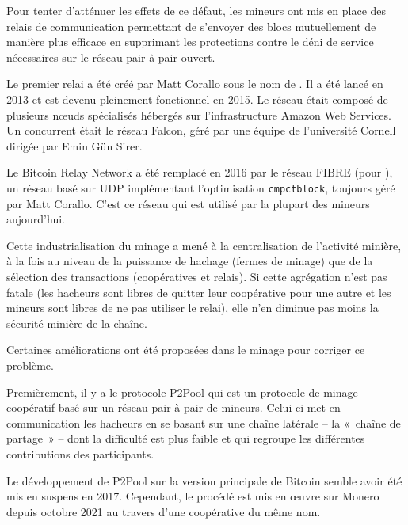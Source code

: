 Pour tenter d'atténuer les effets de ce défaut, les mineurs ont mis en place des relais de communication permettant de s'envoyer des blocs mutuellement de manière plus efficace en supprimant les protections contre le déni de service nécessaires sur le réseau pair-à-pair ouvert.

Le premier relai a été créé par Matt Corallo sous le nom de . Il a été lancé en 2013 et est devenu pleinement fonctionnel en 2015. Le réseau était composé de plusieurs nœuds spécialisés hébergés sur l'infrastructure Amazon Web Services. Un concurrent était le réseau Falcon, géré par une équipe de l'université Cornell dirigée par Emin Gün Sirer.

Le Bitcoin Relay Network a été remplacé en 2016 par le réseau FIBRE (pour ), un réseau basé sur UDP implémentant l'optimisation \texttt{cmpctblock}, toujours géré par Matt Corallo. C'est ce réseau qui est utilisé par la plupart des mineurs aujourd'hui.


Cette industrialisation du minage a mené à la centralisation de l'activité minière, à la fois au niveau de la puissance de hachage (fermes de minage) que de la sélection des transactions (coopératives et relais). Si cette agrégation n'est pas fatale (les hacheurs sont libres de quitter leur coopérative pour une autre et les mineurs sont libres de ne pas utiliser le relai), elle n'en diminue pas moins la sécurité minière de la chaîne.

Certaines améliorations ont été proposées dans le minage pour corriger ce problème.

Premièrement, il y a le protocole P2Pool qui est un protocole de minage coopératif basé sur un réseau pair-à-pair de mineurs. Celui-ci met en communication les hacheurs en se basant sur une chaîne latérale -- la «~chaîne de partage~» -- dont la difficulté est plus faible et qui regroupe les différentes contributions des participants.

Le développement de P2Pool sur la version principale de Bitcoin semble avoir été mis en suspens en 2017. Cependant, le procédé est mis en œuvre sur Monero depuis octobre 2021 au travers d'une coopérative du même nom.

